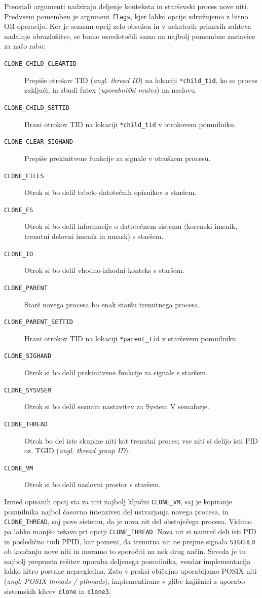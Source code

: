 \documentclass[a4paper,12pt,openright]{book}
\begin{document}
Preostali argumenti nadzirajo deljenje konteksta in starševski proces nove niti.
Predvsem pomemben je argument \texttt{flags}, kjer lahko opcije združujemo z bitno OR operacijo.
Ker je seznam opcij zelo obsežen in v nekaterih primerih zahteva nadalnje obrazložitve, se bomo osredotočili samo na najbolj pomembne zastavice za našo rabo:
\begin{description}
	\item [\texttt{CLONE\_CHILD\_CLEARTID}] Prepiše otrokov TID (\textit{angl. thread ID}) na lokaciji \texttt{*child\_tid}, ko se proces zaključi, in zbudi futex (\textit{uporabniški mutex}) na naslovu.
	\item [\texttt{CLONE\_CHILD\_SETTID}] Hrani otrokov TID na lokaciji \texttt{*child\_tid} v otrokovem pomnilniku.
	\item [\texttt{CLONE\_CLEAR\_SIGHAND}] Prepiše prekinitvene funkcije za signale v otroškem procesu.
	\item [\texttt{CLONE\_FILES}] Otrok si bo delil tabelo datotečnih opisnikov s staršem.
	\item [\texttt{CLONE\_FS}] Otrok si bo delil informacije o datotečnem sistemu (korenski imenik, trenutni delovni imenik in umask) s staršem.
	\item [\texttt{CLONE\_IO}] Otrok si bo delil vhodno-izhodni konteks s staršem.
	\item [\texttt{CLONE\_PARENT}] Starš novega procesa bo enak staršu trenutnega procesa.
	\item [\texttt{CLONE\_PARENT\_SETTID}] Hrani otrokov TID na lokaciji \texttt{*parent\_tid} v starševem pomnilniku.
	\item [\texttt{CLONE\_SIGHAND}] Otrok si bo delil prekinitvene funkcije za signale s staršem.
	\item [\texttt{CLONE\_SYSVSEM}] Otrok si bo delil seznam nastavitev za System V semaforje.
	\item [\texttt{CLONE\_THREAD}] Otrok bo del iste skupine niti kot trenutni proces; vse niti si delijo isti PID oz. TGID (\textit{angl. thread group ID}).
	\item [\texttt{CLONE\_VM}] Otrok si bo delil naslovni prostor s staršem.
\end{description}

Izmed opisanih opcij sta za niti najbolj ključni \texttt{CLONE\_VM}, saj je kopiranje pomnilnika najbol časovno intenziven del ustvarjanja novega procesa, in \texttt{CLONE\_THREAD}, saj pove sistemu, da je nova nit del obstoječega procesa.
Vidimo pa lahko manjšo težavo pri opciji \texttt{CLONE\_THREAD}.
Nova nit si namreč deli isti PID in posledično tudi PPID, kar pomeni, da trenutna nit ne prejme signala \texttt{SIGCHLD} ob končanju nove niti in moramo to sporočiti na nek drug način.
Seveda je tu najbolj preprosta rešitev uporaba deljenega pomnilnika, vendar implementacija lahko hitro postane nepregledna.
Zato v praksi običajno uporabljamo POSIX niti (\textit{angl. POSIX threads / pthreads}), implementirane v glibc knjižnici z uporabo sistemskih klicev \texttt{clone} in \texttt{clone3}.
\end{document}
